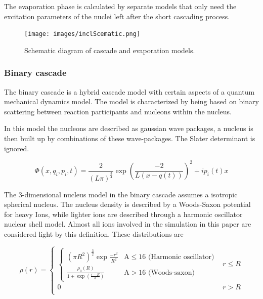 The evaporation phase is calculated by separate models that only need the excitation parameters of the nuclei left after the short cascading process.

\begin{figure} 
\begin{center}
\texttt{[image: images/inclScematic.png]}  
\caption{\label{fig:inclschematic} Schematic diagram of cascade and evaporation models.}
 
 \end{center}
 \end{figure}

\subsubsection{Binary cascade}
The binary cascade is a hybrid cascade model with certain aspects of a quantum mechanical dynamics model. The model is characterized by being based on binary scattering between reaction participants and nucleons within the nucleus.

In this model the nucleons are described as gaussian wave packages, a nucleus is then built up by combinations of these wave-packages. The Slater determinant is ignored.


\begin{equation}
\Phi(x,q_i,p_i,t) = \frac{2}{(L\pi)^{\frac{3}{4}}}\exp{(\frac{-2}{L(x - q(t))})^2+ip_i(t)x}
\label{wavePackage}
\end{equation}


The 3-dimensional nucleus model in the binary cascade assumes a isotropic spherical nucleus. The nucleus density is described by a Woods-Saxon potential for heavy Ions, while lighter ions are described through a harmonic oscillator nuclear shell model. Almost all ions involved in the simulation in this paper are considered light by this definition. These distributions are 

\begin{equation}
\rho(r) = 
\begin{cases}
\begin{cases}
(\pi R^2)^{\frac{3}{2}}\exp{\frac{-r^2}{R^2}} & \text{A} \le 16 \text{  (Harmonic oscillator)}\\
\frac{\rho_{0}(R)}{1+\exp({\frac{r-R}{a}})} & \text{A} > 16 \text{  (Woods-saxon)}
\end{cases} & r \le R \\
0 & r > R \\
\end{cases}
\label{binaryCascadePotential}
\end{equation}

